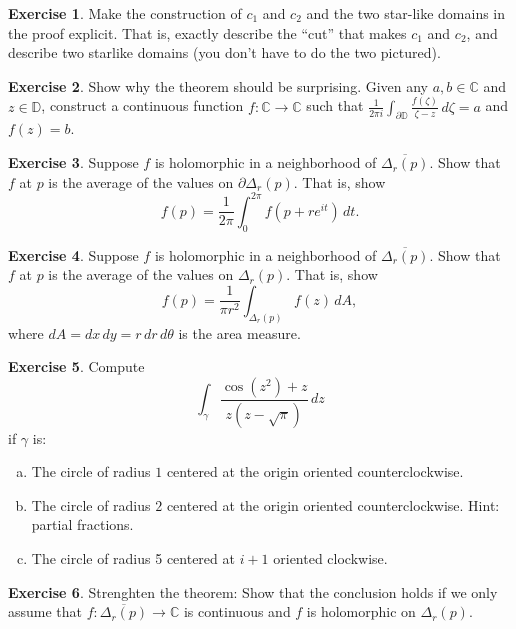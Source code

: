 \documentclass[12pt,openany]{book}
\newcommand{\C}{{\mathbb{C}}}
\newcommand{\D}{{\mathbb{D}}}
\theoremstyle{plain}
\theoremstyle{remark}
\theoremstyle{definition}
\newenvironment{exbox}{%
    \def\FrameCommand{\vrule width 1pt \relax\hspace{10pt}}%
    \MakeFramed{\advance\hsize-\width\FrameRestore}%
}{%
    \endMakeFramed
}
\newenvironment{exparts}{%
    \leavevmode\begin{enumerate}[a),noitemsep,topsep=0pt,parsep=0pt,partopsep=0pt]
}{%
    \end{enumerate}
}
\theoremstyle{exercise}
\newtheorem{exercise}{Exercise}[section]
\theoremstyle{example}
\begin{document}
\begin{exbox}
\begin{exercise}
Make the construction of $c_1$ and $c_2$ and the two star-like domains
in the proof explicit.  That is, exactly describe the ``cut'' that makes
$c_1$ and $c_2$, and describe two starlike domains (you don't have to do the
two pictured).
\end{exercise}

\begin{exercise}
Show why the theorem should be surprising.  Given any $a,b \in \C$ and $z
\in \D$, construct a continuous function
$f \colon \C \to \C$ such that $\frac{1}{2\pi i}\int_{\partial \D}
\frac{f(\zeta)}{\zeta -z} \, d\zeta = a$ and $f(z) = b$.
\end{exercise}

\begin{exercise}
Suppose $f$ is holomorphic in a neighborhood of $\overline{\Delta_r(p)}$.
Show that $f$ at $p$ is the average of the values on $\partial \Delta_r(p)$.
That is, show
\begin{equation*}
f(p) = \frac{1}{2\pi} \int_0^{2\pi} f(p + r e^{it}) \, dt .
\end{equation*}
\end{exercise}

\begin{exercise}
Suppose $f$ is holomorphic in a neighborhood of $\overline{\Delta_r(p)}$.
Show that $f$ at $p$ is the average of the values on $\Delta_r(p)$.
That is, show
\begin{equation*}
f(p) = \frac{1}{\pi r^2} \int_{\Delta_r(p)} f(z) \, dA ,
\end{equation*}
where $dA = dx \, dy = r \, dr \, d\theta$ is the area measure.
\end{exercise}

\begin{exercise}
Compute 
\begin{equation*}
\int_\gamma \frac{\cos ( z^2 ) +z}{z(z-\sqrt{\pi})} \, dz
\end{equation*}
if $\gamma$ is:
\begin{exparts}
\item
The circle of radius $1$ centered at the origin oriented
counterclockwise.
\item
The circle of radius $2$ centered at the origin oriented
counterclockwise.  Hint: partial fractions.
\item
The circle of radius 5 centered at $i+1$ oriented clockwise.
\end{exparts}
\end{exercise}

\begin{exercise} \label{exercise:cauchycont}
Strenghten the theorem:  Show that the conclusion holds if
we only assume that $f \colon \overline{\Delta_r(p)} \to \C$
is continuous and $f$ is holomorphic on $\Delta_r(p)$.
\end{exercise}
\end{exbox}
\end{document}
